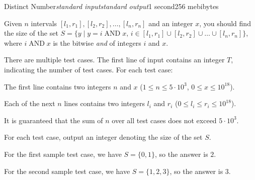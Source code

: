 \begin{problem}{Distinct Number}{\textsl{standard input}}{\textsl{standard output}}{1 second}{256 mebibytes}

Given $n$ intervals $[l_1,r_1], [l_2,r_2], \ldots, [l_n, r_n]$ and an integer $x$, you should find the size of the set $S = \{y \mid y = i \operatorname{AND} x, \, i \in [l_1, r_1] \cup [l_2, r_2] \cup \ldots \cup [l_n, r_n]\}$, where $i\operatorname{AND} x$ is the bitwise \textit{and} of integers $i$ and $x$.

\InputFile
There are multiple test cases. The first line of input contains an integer $T$, indicating the number of test cases. For each test case:

The first line contains two integers $n$ and $x$ ($1 \le n \le 5 \cdot 10^3$, $0 \le x \le 10^{18}$).

Each of the next $n$ lines contains two integers $l_i$ and $r_i$ ($0 \le l_i \le r_i \le 10^{18}$).

It is guaranteed that the sum of $n$ over all test cases does not exceed $5 \cdot 10^3$.


\OutputFile
For each test case, output an integer denoting the size of the set $S$.




\Example

\begin{example}
%
\end{example}

\Note
For the first sample test case, we have $S = \{0, 1\}$, so the answer is $2$.

For the second sample test case, we have $S = \{1, 2, 3\}$, so the answer is $3$.

\end{problem}
